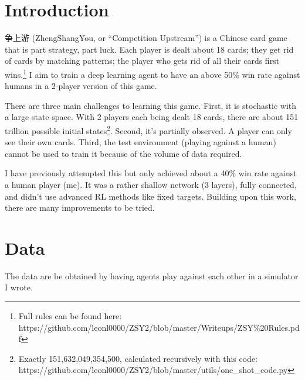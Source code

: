 \documentclass{article}
\begin{document}


\section{Introduction}
争上游 (ZhengShangYou, or “Competition Upstream”) is a Chinese card game that is part strategy, part luck. Each player is dealt about 18 cards; they get rid of cards by matching patterns; the player who gets rid of all their cards first wins.\footnote{Full rules can be found here:\\ https://github.com/leonl0000/ZSY2/blob/master/Writeups/ZSY\%20Rules.pdf} I aim to train a deep learning agent to have an above 50\% win rate against humans in a 2-player version of this game.

There are three main challenges to learning this game. First, it is stochastic with a large state space. With 2 players each being dealt 18 cards, there are about 151 trillion possible initial states\footnote{Exactly 151,632,049,354,500, calculated recursively with this code: https://github.com/leonl0000/ZSY2/blob/master/utils/one\_shot\_code.py}. Second, it’s partially observed. A player can only see their own cards. Third, the test environment (playing against a human) cannot be used to train it because of the volume of data required.

I have previously attempted this but only achieved about a 40\% win rate against a human player (me). It was a rather shallow network (3 layers), fully connected, and didn’t use advanced RL methods like fixed targets. Building upon this work, there are many improvements to be tried.

\section{Data}
The data are be obtained by having agents play against each other in a simulator I wrote.
\end{document}
